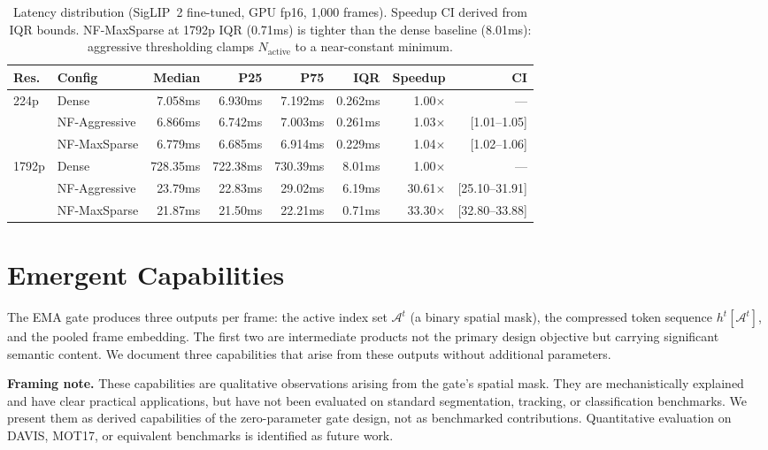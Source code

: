 \documentclass{article}
\begin{document}
\begin{table}[htbp]
\centering
\setlength{\tabcolsep}{4pt}
\begin{tabular}{llrrrrrr}
\toprule
\textbf{Res.} & \textbf{Config} & \textbf{Median} &
    \textbf{P25} & \textbf{P75} & \textbf{IQR} &
    \textbf{Speedup} & \textbf{CI} \\
\midrule
224p  & Dense       & 7.058ms & 6.930ms & 7.192ms & 0.262ms & 1.00$\times$ & — \\
      & NF-Aggressive & 6.866ms & 6.742ms & 7.003ms & 0.261ms & 1.03$\times$ & [1.01–1.05] \\
      & NF-MaxSparse  & 6.779ms & 6.685ms & 6.914ms & 0.229ms & 1.04$\times$ & [1.02–1.06] \\
\midrule
1792p & Dense       & 728.35ms & 722.38ms & 730.39ms & 8.01ms & 1.00$\times$ & — \\
      & NF-Aggressive & 23.79ms & 22.83ms & 29.02ms & 6.19ms & 30.61$\times$ & [25.10–31.91] \\
      & NF-MaxSparse  & 21.87ms & 21.50ms & 22.21ms & 0.71ms & 33.30$\times$ & [32.80–33.88] \\
\bottomrule
\end{tabular}
\caption{Latency distribution (SigLIP~2 fine-tuned, GPU fp16, 1{,}000
frames). Speedup CI derived from IQR bounds. NF-MaxSparse at 1792p IQR
(0.71ms) is tighter than the dense baseline (8.01ms): aggressive
thresholding clamps $N_{\text{active}}$ to a near-constant minimum.}
\label{tab:latency_iqr}
\end{table}

\section{Emergent Capabilities}\label{emergent-capabilities}

The EMA gate produces three outputs per frame: the active index set
$\mathcal{A}^t$ (a binary spatial mask), the compressed token sequence
$h^t[\mathcal{A}^t]$, and the pooled frame embedding. The first two are
intermediate products not the primary design objective but carrying
significant semantic content. We document three capabilities that arise
from these outputs without additional parameters.

\textbf{Framing note.} These capabilities are qualitative observations
arising from the gate's spatial mask. They are mechanistically explained
and have clear practical applications, but have not been evaluated on
standard segmentation, tracking, or classification benchmarks. We present
them as derived capabilities of the zero-parameter gate design, not as
benchmarked contributions. Quantitative evaluation on DAVIS, MOT17, or
equivalent benchmarks is identified as future work.
\end{document}
